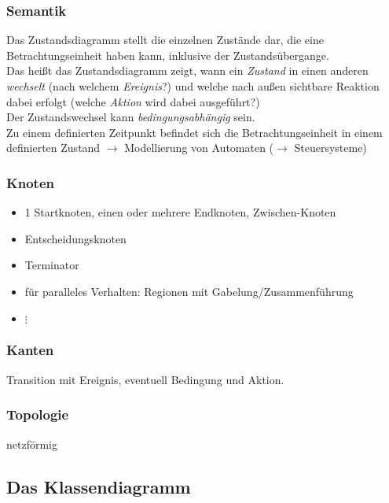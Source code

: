 \subsubsection{Semantik}
Das Zustandsdiagramm stellt die einzelnen Zustände dar, die eine Betrachtungseinheit haben kann, inklusive der Zustandsübergange.\\
Das heißt das Zustandsdiagramm zeigt, wann ein \emph{Zustand} in einen anderen \emph{wechselt} (nach welchem \emph{Ereignis}?) und welche nach außen sichtbare Reaktion dabei erfolgt (welche \emph{Aktion} wird dabei ausgeführt?)\\
Der Zustandswechsel kann \emph{bedingungsabhängig} sein.\\
Zu einem definierten Zeitpunkt befindet sich die Betrachtungseinheit in einem definierten Zustand $\to$ Modellierung von Automaten ($\to$ Steuersysteme)


\subsubsection{Knoten}
\begin{itemize}
	\item 1 Startknoten, einen oder mehrere Endknoten, Zwischen-Knoten
	\item Entscheidungsknoten
	\item Terminator
	\item für paralleles Verhalten: Regionen mit Gabelung/Zusammenführung
	\item[] $\vdots$
\end{itemize}

\subsubsection{Kanten}
Transition mit Ereignis, eventuell Bedingung und Aktion.

\subsubsection{Topologie}
netzförmig

\subsection{Das Klassendiagramm}
